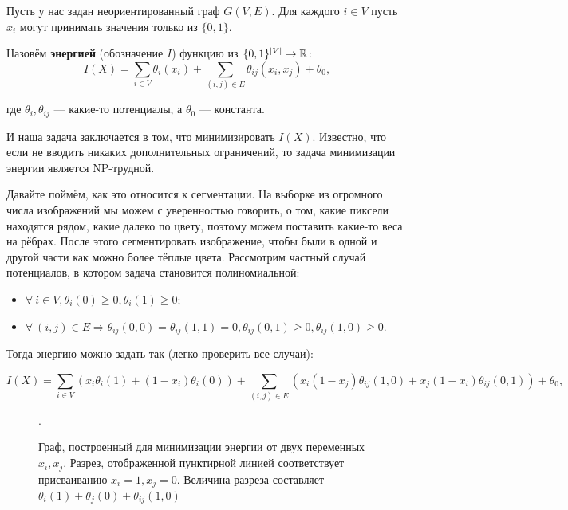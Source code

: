 \documentclass[a4paper, 12pt]{article}
\begin{document}
Пусть у нас задан неориентированный граф $G(V, E)$. Для каждого $i \in V$ пусть
$x_i$ могут принимать значения только из $\{0, 1\}$.

\begin{Def}
  Назовём \textbf{энергией} (обозначение $I$) функцию из $\{0, 1\}^{|V|} \to
  \mathbb{R}$:
  \[
    I(X) = \sum_{i \in V} \theta_i(x_i) + \sum_{(i, j) \in E} \theta_{ij}(x_i, x_j) +
    \theta_0,
  \]

  где $\theta_i, \theta_{ij}$ --- какие-то потенциалы, а $\theta_0$ --- константа.
\end{Def}

И наша задача заключается в том, что минимизировать $I(X)$. Известно, что если
не вводить никаких дополнительных ограничений, то задача минимизации 
энергии является NP-трудной.

Давайте поймём, как
это относится к сегментации. На выборке из огромного числа изображений мы
можем с уверенностью говорить, о том, какие пиксели находятся рядом, какие
далеко по цвету, поэтому можем поставить какие-то веса на рёбрах. После этого
сегментировать изображение, чтобы были в одной и другой части как можно
более тёплые цвета. Рассмотрим частный случай потенциалов, в котором задача
становится полиномиальной:

\begin{itemize}
  \item $\forall \ i \in V, \theta_i(0) \geqslant 0, \theta_i(1) \geqslant 0$;
  \item $\forall \ (i, j) \in E \Rightarrow \theta_{ij}(0, 0) = \theta_{ij}(1, 1) = 0, 
  \theta_{ij}(0, 1) \geqslant 0, \theta_{ij}(1, 0) \geqslant 0$.
\end{itemize}

Тогда энергию можно задать так (легко проверить все случаи):

\[
  I(X) = \sum_{i \in V} (x_i\theta_i(1) + (1 - x_i)\theta_i(0)) + 
  \sum_{(i, j) \in E} (x_i(1 - x_j)\theta_{ij}(1, 0) + 
  x_j(1 - x_i)\theta_{ij}(0, 1)) + \theta_0,
\]

\begin{figure}[H]
  \caption{Граф, построенный для минимизации энергии от двух переменных
  $x_i, x_j$. Разрез, отображенной пунктирной линией соответствует присваиванию 
  $x_i = 1, x_j = 0$. Величина разреза составляет $\theta_i(1) + \theta_j(0) +
  \theta_{ij}(1, 0)$}.
\end{figure}
\end{document}
